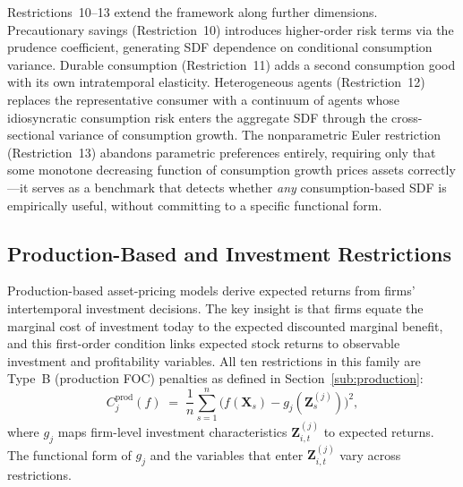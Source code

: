 Restrictions~10--13 extend the framework along further dimensions.
Precautionary savings (Restriction~10) introduces higher-order risk terms via the prudence coefficient, generating SDF dependence on conditional consumption variance.
Durable consumption (Restriction~11) adds a second consumption good with its own intratemporal elasticity.
Heterogeneous agents (Restriction~12) replaces the representative consumer with a continuum of agents whose idiosyncratic consumption risk enters the aggregate SDF through the cross-sectional variance of consumption growth.
The nonparametric Euler restriction (Restriction~13) abandons parametric preferences entirely, requiring only that some monotone decreasing function of consumption growth prices assets correctly---it serves as a benchmark that detects whether \emph{any} consumption-based SDF is empirically useful, without committing to a specific functional form.


\subsection{Production-Based and Investment Restrictions}\label{sub:prod_restrictions}

Production-based asset-pricing models derive expected returns from firms' intertemporal investment decisions.
The key insight is that firms equate the marginal cost of investment today to the expected discounted marginal benefit, and this first-order condition links expected stock returns to observable investment and profitability variables.
All ten restrictions in this family are Type~B (production FOC) penalties as defined in Section~\ref{sub:production}:
\begin{equation}\label{eq:prod_family}
C_j^{\mathrm{prod}}(f) \;=\;
\frac{1}{n}\sum_{s=1}^{n}
\bigl(f(\mathbf{X}_s) - g_j(\mathbf{Z}_s^{(j)})\bigr)^2,
\end{equation}
where $g_j$ maps firm-level investment characteristics $\mathbf{Z}_{i,t}^{(j)}$ to expected returns.
The functional form of $g_j$ and the variables that enter $\mathbf{Z}_{i,t}^{(j)}$ vary across restrictions.

